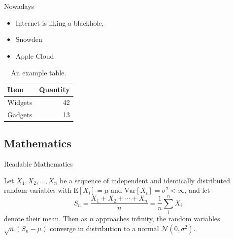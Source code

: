 \documentclass{beamer}
\begin{document}
\section{}


\begin{frame}{Nowadays}

\begin{itemize}
\item Internet is liking a blackhole, 
\item Snowden
\item Apple Cloud
\end{itemize}


\begin{table}
\centering
\begin{tabular}{l|r}
Item & Quantity \\\hline
Widgets & 42 \\
Gadgets & 13
\end{tabular}
\caption{\label{tab:widgets}An example table.}
\end{table}

\end{frame}

\subsection{Mathematics}

\begin{frame}{Readable Mathematics}

Let $X_1, X_2, \ldots, X_n$ be a sequence of independent and identically distributed random variables with $\text{E}[X_i] = \mu$ and $\text{Var}[X_i] = \sigma^2 < \infty$, and let
$$S_n = \frac{X_1 + X_2 + \cdots + X_n}{n}
      = \frac{1}{n}\sum_{i}^{n} X_i$$
denote their mean. Then as $n$ approaches infinity, the random variables $\sqrt{n}(S_n - \mu)$ converge in distribution to a normal $\mathcal{N}(0, \sigma^2)$.

\end{frame}
\end{document}
